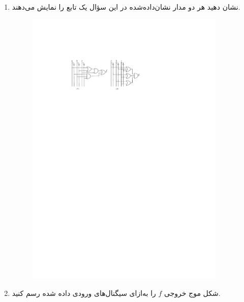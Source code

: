 \begin{enumerate}
	\item 
	نشان دهید هر دو مدار نشان‌داده‌شده در این سؤال یک تابع را نمایش می‌دهند. 
	
	\begin{figure}[h]
		\centering
		\includegraphics[width=0.9\textwidth]{fig/Q3_b.pdf}
		\label{fig:Q6_a}
	\end{figure}
	
	\item 
	شکل موج خروجی $f$ را به‌ازای سیگنال‌های ورودی داده شده رسم کنید.
	

\end{enumerate}
